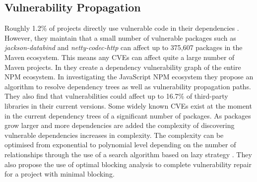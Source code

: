 \documentclass[conference]{IEEEtran}
\begin{document}
\subsection{Vulnerability Propagation}
Roughly 1.2\% of projects directly use vulnerable code in their dependencies \cite{a_m_mir_effect_2023}. However, they maintain that a small number of vulnerable packages such as \textit{jackson-databind} and \textit{netty-codec-http} can affect up to 375,607 packages in the Maven ecosystem. This means any CVEs can affect quite a large number of Maven projects. In \cite{c_liu_demystifying_2022} they create a dependency vulnerability graph of the entire NPM ecosystem. In investigating the JavaScript NPM ecosystem they propose an algorithm to resolve dependency trees as well as vulnerability propagation paths. They also find that vulnerabilities could affect up to 16.7\% of third-party libraries in their current versions. Some widely known CVEs exist at the moment in the current dependency trees of a significant number of packages. As packages grow larger and more dependencies are added the complexity of discovering vulnerable dependencies increases in complexity. The complexity can be optimised from exponential to polynomial level depending on the number of relationships through the use of a search algorithm based on lazy strategy \cite{w_hu_open_2019}. They also propose the use of optimal blocking analysis to complete vulnerability repair for a project with minimal blocking.
\end{document}
